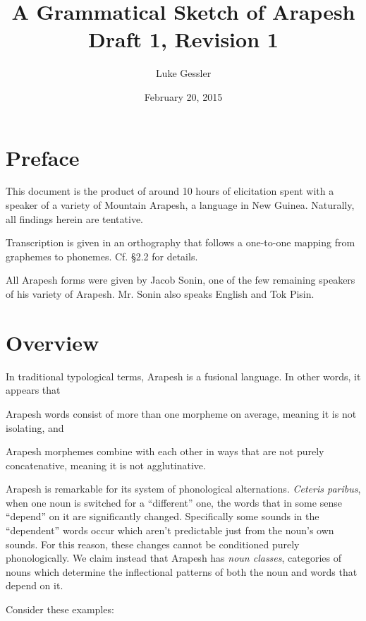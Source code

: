 \documentclass[pdftex,12pt,letterpaper]{article}
\title{A Grammatical Sketch of Arapesh \\ Draft 1, Revision 1}
\author{Luke Gessler}
\date{February 20, 2015}
\begin{document}

\tableofcontents
\listoffigures
\pagebreak
\doublespacing

\section*{Preface}

This document is the product of around 10 hours of elicitation spent with a speaker of a variety of Mountain Arapesh, a language in New Guinea. Naturally, all findings herein are tentative.

Transcription is given in an orthography that follows a one-to-one mapping from graphemes to phonemes. Cf. \S 2.2 for details.

All Arapesh forms were given by Jacob Sonin, one of the few remaining speakers of his variety of Arapesh. Mr. Sonin also speaks English and Tok Pisin.

\section{Overview}

In traditional typological terms, Arapesh is a fusional language. In other words, it appears that \begin{inparaenum} [(a)] \item Arapesh words consist of more than one morpheme on average, meaning it is not isolating, and \item Arapesh morphemes combine with each other in ways that are not purely concatenative, meaning it is not agglutinative. \end{inparaenum} 

Arapesh is remarkable for its system of phonological alternations. \emph{Ceteris paribus}, when one noun is switched for a ``different'' one, the words that in some sense ``depend'' on it are significantly changed. Specifically some sounds in the ``dependent'' words occur which aren't predictable just from the noun's own sounds. For this reason, these changes cannot be conditioned purely phonologically. We claim instead that Arapesh has \emph{noun classes}, categories of nouns which determine the inflectional patterns of both the noun and words that depend on it.

Consider these examples:
\end{document}
